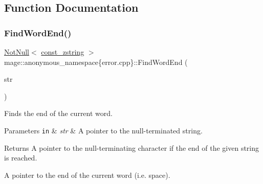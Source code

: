 \subsection{Function Documentation}
\mbox{\label{namespacemage_1_1anonymous__namespace_02error_8cpp_03_abcee849d53ddc420623108f831c88b0c}} 
\subsubsection{\texorpdfstring{Find\+Word\+End()}{FindWordEnd()}}
{\footnotesize\ttfamily \mbox{\hyperlink{namespacemage_a8769f9d670d6b585ea306cb1062af94b}{Not\+Null}}$<$ \mbox{\hyperlink{namespacemage_abfd9206dc607ceb5d13ec68bf075a5c0}{const\+\_\+zstring}} $>$ mage\+::anonymous\+\_\+namespace\{error.\+cpp\}\+::Find\+Word\+End (\begin{DoxyParamCaption}\item[{\mbox{\hyperlink{namespacemage_a8769f9d670d6b585ea306cb1062af94b}{Not\+Null}}$<$ \mbox{\hyperlink{namespacemage_abfd9206dc607ceb5d13ec68bf075a5c0}{const\+\_\+zstring}} $>$}]{str }\end{DoxyParamCaption})\hspace{0.3cm}{\ttfamily [noexcept]}}

Finds the end of the current word.


\begin{DoxyParams}[1]{Parameters}
\mbox{\tt in}  & {\em str} & A pointer to the null-\/terminated string. \\
\hline
\end{DoxyParams}
\begin{DoxyReturn}{Returns}
A pointer to the null-\/terminating character if the end of the given string is reached. 

A pointer to the end of the current word (i.\+e. space). 
\end{DoxyReturn}
\mbox{\label{namespacemage_1_1anonymous__namespace_02error_8cpp_03_ac2c9c8d3c3af36b6b785b48fb81cd22b}} 
